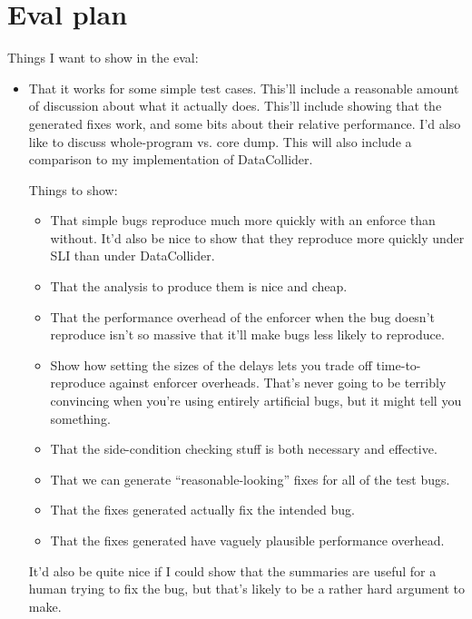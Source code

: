 
\section{Eval plan}

Things I want to show in the eval:

\begin{itemize}
\item That it works for some simple test cases.  This'll include a
  reasonable amount of discussion about what it actually does.
  This'll include showing that the generated fixes work, and some bits
  about their relative performance.  I'd also like to discuss
  whole-program vs. core dump.  This will also include a comparison to
  my implementation of DataCollider.

  Things to show:

  \begin{itemize}
  \item That simple bugs reproduce much more quickly with an enforce
    than without.  It'd also be nice to show that they reproduce more
    quickly under SLI than under DataCollider.
  \item That the analysis to produce them is nice and cheap.
  \item That the performance overhead of the enforcer when the bug
    doesn't reproduce isn't so massive that it'll make bugs less
    likely to reproduce.
  \item Show how setting the sizes of the delays lets you trade off
    time-to-reproduce against enforcer overheads.  That's never going
    to be terribly convincing when you're using entirely artificial
    bugs, but it might tell you something.
  \item That the side-condition checking stuff is both necessary and
    effective.
  \item That we can generate ``reasonable-looking'' fixes for all of
    the test bugs.
  \item That the fixes generated actually fix the intended bug.
  \item That the fixes generated have vaguely plausible performance
    overhead.
  \end{itemize}

  It'd also be quite nice if I could show that the summaries are
  useful for a human trying to fix the bug, but that's likely to be a
  rather hard argument to make.


\end{itemize}
